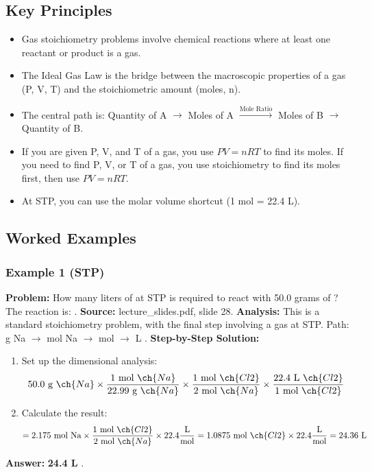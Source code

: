 \documentclass{article}
\begin{document}
\subsection{Key Principles}
\begin{itemize}
    \item Gas stoichiometry problems involve chemical reactions where at least one reactant or product is a gas.
    \item The Ideal Gas Law is the bridge between the macroscopic properties of a gas (P, V, T) and the stoichiometric amount (moles, n).
    \item The central path is: Quantity of A $\rightarrow$ Moles of A $\xrightarrow{\text{Mole Ratio}}$ Moles of B $\rightarrow$ Quantity of B.
    \item If you are given P, V, and T of a gas, you use $PV=nRT$ to find its moles. If you need to find P, V, or T of a gas, you use stoichiometry to find its moles first, then use $PV=nRT$.
    \item At STP, you can use the molar volume shortcut (1 mol = 22.4 L).
\end{itemize}

\subsection{Worked Examples}
\subsubsection{Example 1 (STP)}
\textbf{Problem:} How many liters of  at STP is required to react with 50.0 grams of ? The reaction is: .
\textbf{Source:} lecture\_slides.pdf, slide 28.
\textbf{Analysis:} This is a standard stoichiometry problem, with the final step involving a gas at STP. Path: g Na $\rightarrow$ mol Na $\rightarrow$ mol  $\rightarrow$ L .
\textbf{Step-by-Step Solution:}
\begin{enumerate}
    \item Set up the dimensional analysis:
    \[ 50.0 \text{ g } \ch{Na} \times \frac{1 \text{ mol } \ch{Na}}{22.99 \text{ g } \ch{Na}} \times \frac{1 \text{ mol } \ch{Cl2}}{2 \text{ mol } \ch{Na}} \times \frac{22.4 \text{ L } \ch{Cl2}}{1 \text{ mol } \ch{Cl2}} \]
    \item Calculate the result:
    \[ = 2.175 \text{ mol Na} \times \frac{1 \text{ mol } \ch{Cl2}}{2 \text{ mol } \ch{Na}} \times 22.4 \frac{\text{L}}{\text{mol}} = 1.0875 \text{ mol } \ch{Cl2} \times 22.4 \frac{\text{L}}{\text{mol}} = 24.36 \text{ L} \]
\end{enumerate}
\textbf{Answer:} \textbf{24.4 L }.
\end{document}

